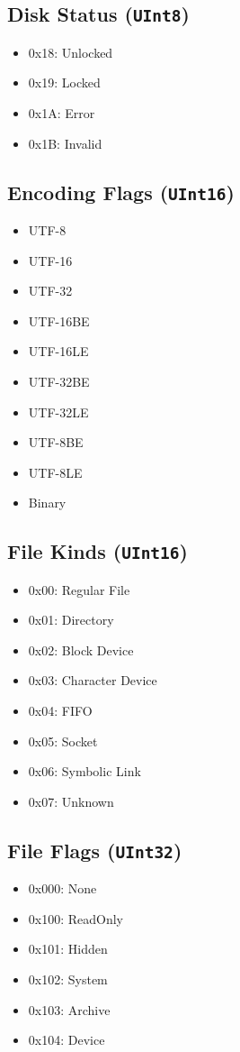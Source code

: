 \documentclass{article}
\begin{document}
\subsection{Disk Status (\texttt{UInt8})}\label{subsec:disk-status-(texttt{uint8})}
\begin{itemize}
\item 0x18: Unlocked
\item 0x19: Locked
\item 0x1A: Error
\item 0x1B: Invalid
\end{itemize}

\subsection{Encoding Flags (\texttt{UInt16})}\label{subsec:encoding-flags-(texttt{uint16})}
\begin{itemize}
\item UTF-8
\item UTF-16
\item UTF-32
\item UTF-16BE
\item UTF-16LE
\item UTF-32BE
\item UTF-32LE
\item UTF-8BE
\item UTF-8LE
\item Binary
\end{itemize}

\subsection{File Kinds (\texttt{UInt16})}\label{subsec:file-kinds-(texttt{uint16})}
\begin{itemize}
\item 0x00: Regular File
\item 0x01: Directory
\item 0x02: Block Device
\item 0x03: Character Device
\item 0x04: FIFO
\item 0x05: Socket
\item 0x06: Symbolic Link
\item 0x07: Unknown
\end{itemize}

\subsection{File Flags (\texttt{UInt32})}\label{subsec:file-flags-(texttt{uint32})}
\begin{itemize}
\item 0x000: None
\item 0x100: ReadOnly
\item 0x101: Hidden
\item 0x102: System
\item 0x103: Archive
\item 0x104: Device
\end{itemize}
\end{document}
